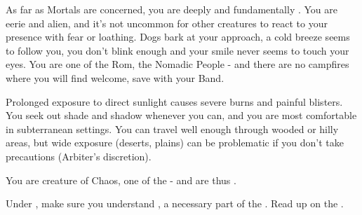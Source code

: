 \begin{multicols*}{2}
\newpage




  As far as Mortals are concerned, you are deeply and fundamentally . You are eerie and alien, and it's not uncommon for other creatures to react to your presence with fear or loathing. Dogs bark at your approach, a cold breeze seems to follow you, you don't blink enough and your smile never seems to touch your eyes. You are one of the Rom, the Nomadic People - and there are no campfires where you will find welcome, save with your Band.




  Prolonged exposure to direct sunlight causes severe burns and painful blisters.  You seek out shade and shadow whenever you can, and you are most comfortable in subterranean settings.  You can travel well enough through wooded or hilly areas, but wide exposure (deserts, plains) can be problematic if you don't take precautions (Arbiter's discretion).

    
  You are creature of Chaos, one of the  - and are thus .

\cbreak






    Under , make sure you understand , a necessary part of the . Read up on the .

\end{multicols*}

